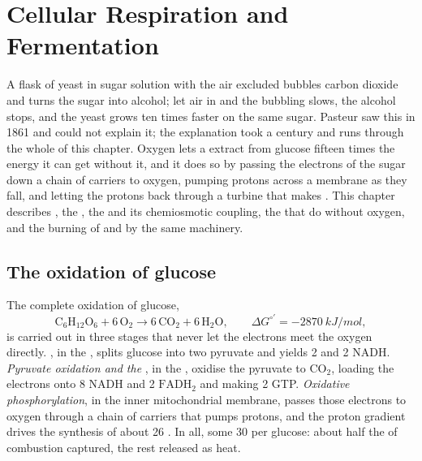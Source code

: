 \chapter{Cellular Respiration and Fermentation}\label{ch:b1:respiration-fermentation}

A flask of yeast in sugar solution with the air excluded bubbles
carbon dioxide and turns the sugar into alcohol; let air in and the
bubbling slows, the alcohol stops, and the yeast grows ten times faster
on the same sugar. Pasteur saw this in 1861 and could not explain it;
the explanation took a century and runs through the whole of this
chapter. Oxygen lets a  extract from glucose fifteen times the
energy it can get without it, and it does so by passing the electrons
of the sugar down a chain of carriers to oxygen, pumping protons across
a membrane as they fall, and letting the protons back through a
turbine that makes . This chapter describes , the , the  and its chemiosmotic coupling, the
 that do without oxygen, and the burning of  and
 by the same machinery.

\section{The oxidation of glucose}

\begin{proposition}\label{prop:b1:respiration-fermentation:overview}
The complete oxidation of glucose,
\[
\mathrm{C_6H_{12}O_6} + 6\,\mathrm{O_2} \to 6\,\mathrm{CO_2} + 6\,\mathrm{H_2O},
\qquad \Delta G^{\circ\prime} = \qty{-2870}{kJ/mol},
\]
is carried out in three stages that never let the electrons meet the
oxygen directly. \emph{}, in the , splits glucose
into two pyruvate and yields 2  and 2 NADH. \emph{Pyruvate
oxidation and the }, in the , oxidise
the pyruvate to $\mathrm{CO_2}$, loading the electrons onto 8 NADH and
2 $\mathrm{FADH_2}$ and making 2 GTP. \emph{Oxidative
phosphorylation}, in the inner mitochondrial membrane, passes those
electrons to oxygen through a chain of carriers that pumps protons,
and the proton gradient drives the synthesis of about 26 . In all,
some 30  per glucose: about half the  of combustion
captured, the rest released as heat.
\end{proposition}

